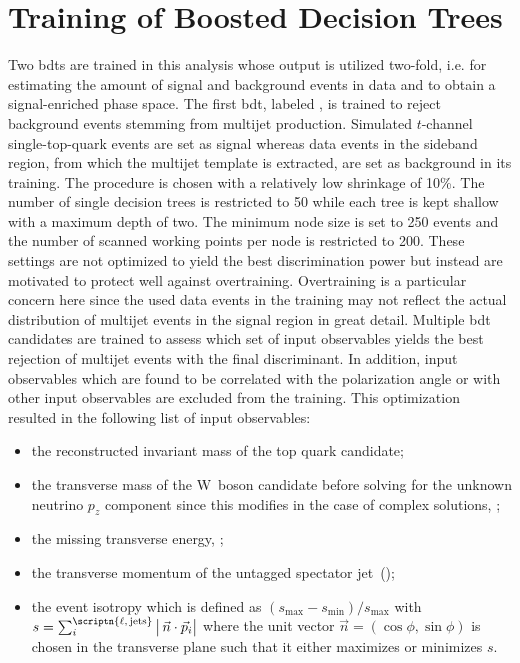 \section{Training of Boosted Decision Trees}
\label{sec:polarization-bdt-training}

Two \glspl{bdt} are trained in this analysis whose output is utilized two-fold, i.e. for estimating the amount of signal and background events in data and to obtain a signal-enriched phase space. The first \gls{bdt}, labeled \bdtqcd, is trained to reject background events stemming from multijet production. Simulated $t$-channel single-top-quark events are set as signal whereas data events in the sideband region, from which the multijet template is extracted, are set as background in its training. The \GRADIENTBOOST procedure is chosen with a relatively low shrinkage of 10\%. The number of single decision trees is restricted to 50 while each tree is kept shallow with a maximum depth of two. The minimum node size is set to 250 events and the number of scanned working points per node is restricted to 200. These settings are not optimized to yield the best discrimination power but instead are motivated to protect well against overtraining. Overtraining is a particular concern here since the used data events in the training may not reflect the actual distribution of multijet events in the signal region in great detail. Multiple \gls{bdt} candidates are trained to assess which set of input observables yields the best rejection of multijet events with the final discriminant. In addition, input observables which are found to be correlated with the polarization angle or with other input observables are excluded from the training. This optimization resulted in the following list of input observables:

\begin{itemize}
\item the reconstructed invariant mass of the top quark candidate;
\item the transverse mass of the W~boson candidate before solving for the unknown neutrino $p_{z}$ component since this modifies \pvmiss in the case of complex solutions, \mtw;
\item the missing transverse energy, \met;
\item the transverse momentum of the untagged spectator jet~(\jprime);
\item the event isotropy which is defined as $(s_\mathrm{max}-s_\mathrm{min})/s_\mathrm{max}$ with $s=\sum_{i}^\scriptn{\ell,\,\mathrm{jets}}\big|\,\vec{n}\cdot\vec{p}_{i}\big|$ where the unit vector $\vec{n}=(\cos\phi,\sin\phi)$ is chosen in the transverse plane such that it either maximizes or minimizes $s$.
\end{itemize}

